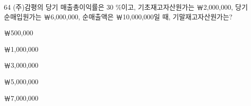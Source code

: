 \begin{question}{64}
(주)감평의 당기 매출총이익률은 30 \%이고, 기초재고자산원가는 ￦2,000,000, 당기순매입원가는 ￦6,000,000, 순매출액은 ￦10,000,000일 때, 기말재고자산원가는?
\begin{choices}
  \item ￦500,000
  \item ￦1,000,000
  \item ￦3,000,000
  \item ￦5,000,000
  \item ￦7,000,000
\end{choices}
\end{question}
